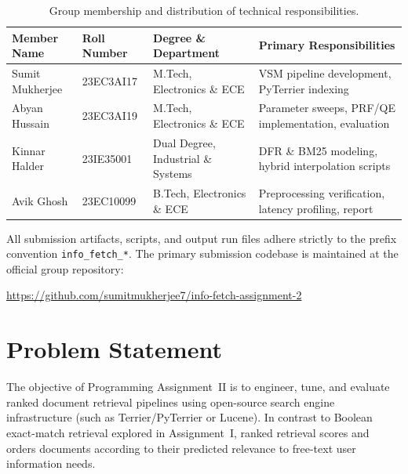 \documentclass[10pt, a4paper]{article}
\begin{document}
\begin{table}[H]
\centering
\small
\begin{tabular}{@{}llll@{}}
\toprule
\textbf{Member Name} & \textbf{Roll Number} & \textbf{Degree \& Department} & \textbf{Primary Responsibilities} \\ \midrule
Sumit Mukherjee & 23EC3AI17 & M.Tech, Electronics \& ECE & VSM pipeline development, PyTerrier indexing \\
Abyan Hussain & 23EC3AI19 & M.Tech, Electronics \& ECE & Parameter sweeps, PRF/QE implementation, evaluation \\
Kinnar Halder & 23IE35001 & Dual Degree, Industrial \& Systems & DFR \& BM25 modeling, hybrid interpolation scripts \\
Avik Ghosh & 23EC10099 & B.Tech, Electronics \& ECE & Preprocessing verification, latency profiling, report \\ \bottomrule
\end{tabular}
\caption{Group membership and distribution of technical responsibilities.}
\label{tab:group_members}
\end{table}

\noindent All submission artifacts, scripts, and output run files adhere strictly to the prefix convention \texttt{info\_fetch\_*}. The primary submission codebase is maintained at the official group repository:
\begin{center}
\url{https://github.com/sumitmukherjee7/info-fetch-assignment-2}
\end{center}

\section{Problem Statement}
\label{sec:problem_statement}

The objective of Programming Assignment~II is to engineer, tune, and evaluate ranked document retrieval pipelines using open-source search engine infrastructure (such as Terrier/PyTerrier or Lucene). In contrast to Boolean exact-match retrieval explored in Assignment~I, ranked retrieval scores and orders documents according to their predicted relevance to free-text user information needs.
\end{document}
